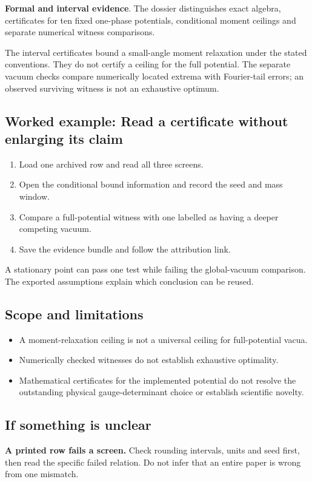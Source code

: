 \documentclass[11pt,a4paper]{article}
\begin{document}
\textbf{Formal and interval evidence}. The dossier distinguishes exact algebra, certificates for ten fixed one-phase potentials, conditional moment ceilings and separate numerical witness comparisons.

The interval certificates bound a small-angle moment relaxation under the stated conventions. They do not certify a ceiling for the full potential. The separate vacuum checks compare numerically located extrema with Fourier-tail errors; an observed surviving witness is not an exhaustive optimum.
\subsection*{Worked example: Read a certificate without enlarging its claim}
\begin{enumerate}
\item Load one archived row and read all three screens.
\item Open the conditional bound information and record the seed and mass window.
\item Compare a full-potential witness with one labelled as having a deeper competing vacuum.
\item Save the evidence bundle and follow the attribution link.
\end{enumerate}
A stationary point can pass one test while failing the global-vacuum comparison. The exported assumptions explain which conclusion can be reused.
\subsection*{Scope and limitations}
\begin{itemize}
\item A moment-relaxation ceiling is not a universal ceiling for full-potential vacua.
\item Numerically checked witnesses do not establish exhaustive optimality.
\item Mathematical certificates for the implemented potential do not resolve the outstanding physical gauge-determinant choice or establish scientific novelty.
\end{itemize}
\subsection*{If something is unclear}
\textbf{A printed row fails a screen.} Check rounding intervals, units and seed first, then read the specific failed relation. Do not infer that an entire paper is wrong from one mismatch.
\end{document}
